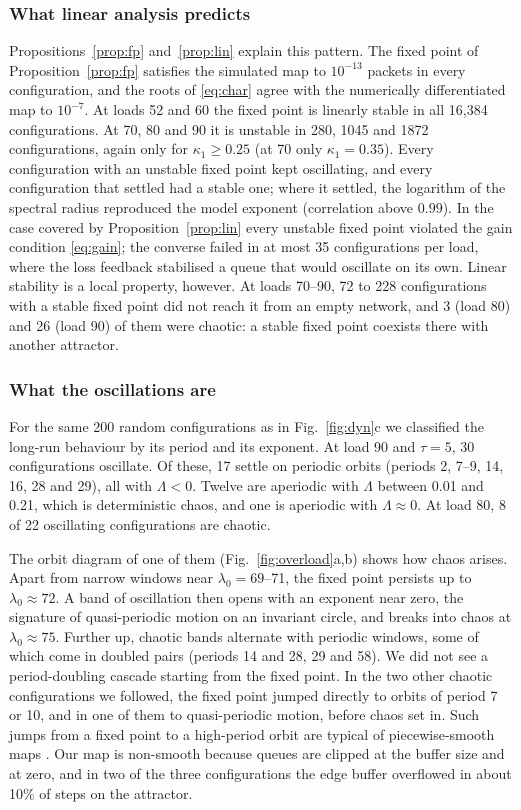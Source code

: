 \documentclass[11pt,a4paper]{article}
\begin{document}
\subsubsection{What linear analysis predicts}
Propositions~\ref{prop:fp} and~\ref{prop:lin} explain this pattern. The fixed point of Proposition~\ref{prop:fp} satisfies the simulated map to $10^{-13}$ packets in every configuration, and the roots of \eqref{eq:char} agree with the numerically differentiated map to $10^{-7}$. At loads 52 and 60 the fixed point is linearly stable in all 16,384 configurations. At 70, 80 and 90 it is unstable in 280, 1045 and 1872 configurations, again only for $\kappa_1\ge0.25$ (at 70 only $\kappa_1=0.35$). Every configuration with an unstable fixed point kept oscillating, and every configuration that settled had a stable one; where it settled, the logarithm of the spectral radius reproduced the model exponent (correlation above $0.99$). In the case covered by Proposition~\ref{prop:lin} every unstable fixed point violated the gain condition \eqref{eq:gain}; the converse failed in at most 35 configurations per load, where the loss feedback stabilised a queue that would oscillate on its own. Linear stability is a local property, however. At loads 70--90, 72 to 228 configurations with a stable fixed point did not reach it from an empty network, and 3 (load 80) and 26 (load 90) of them were chaotic: a stable fixed point coexists there with another attractor.

\subsubsection{What the oscillations are}
For the same 200 random configurations as in Fig.~\ref{fig:dyn}c we classified the long-run behaviour by its period and its exponent. At load 90 and $\tau=5$, 30 configurations oscillate. Of these, 17 settle on periodic orbits (periods 2, 7--9, 14, 16, 28 and 29), all with $\Lambda<0$. Twelve are aperiodic with $\Lambda$ between 0.01 and 0.21, which is deterministic chaos, and one is aperiodic with $\Lambda\approx0$. At load 80, 8 of 22 oscillating configurations are chaotic.

The orbit diagram of one of them (Fig.~\ref{fig:overload}a,b) shows how chaos arises. Apart from narrow windows near $\lambda_0=69$--71, the fixed point persists up to $\lambda_0\approx72$. A band of oscillation then opens with an exponent near zero, the signature of quasi-periodic motion on an invariant circle, and breaks into chaos at $\lambda_0\approx75$. Further up, chaotic bands alternate with periodic windows, some of which come in doubled pairs (periods 14 and 28, 29 and 58). We did not see a period-doubling cascade starting from the fixed point. In the two other chaotic configurations we followed, the fixed point jumped directly to orbits of period 7 or 10, and in one of them to quasi-periodic motion, before chaos set in. Such jumps from a fixed point to a high-period orbit are typical of piecewise-smooth maps \citep{nusse1992border,dibernardo2008piecewise}. Our map is non-smooth because queues are clipped at the buffer size and at zero, and in two of the three configurations the edge buffer overflowed in about 10\% of steps on the attractor.
\end{document}
